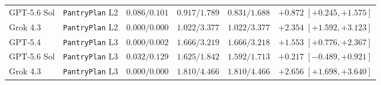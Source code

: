 \begin{table}[!htbp]
{\begin{tabular}{llrrrr}
GPT-5.6 Sol & \texttt{PantryPlan} L2 & $0.086/0.101$ & $0.917/1.789$ & $0.831/1.688$ & $+0.872\;[+0.245,+1.575]$ \\
Grok 4.3 & \texttt{PantryPlan} L2 & $0.000/0.000$ & $1.022/3.377$ & $1.022/3.377$ & $+2.354\;[+1.592,+3.123]$ \\
GPT-5.4 & \texttt{PantryPlan} L3 & $0.000/0.002$ & $1.666/3.219$ & $1.666/3.218$ & $+1.553\;[+0.776,+2.367]$ \\
GPT-5.6 Sol & \texttt{PantryPlan} L3 & $0.032/0.129$ & $1.625/1.842$ & $1.592/1.713$ & $+0.217\;[-0.489,+0.921]$ \\
Grok 4.3 & \texttt{PantryPlan} L3 & $0.000/0.000$ & $1.810/4.466$ & $1.810/4.466$ & $+2.656\;[+1.698,+3.640]$ \\
\bottomrule
\end{tabular}}
\end{table}

